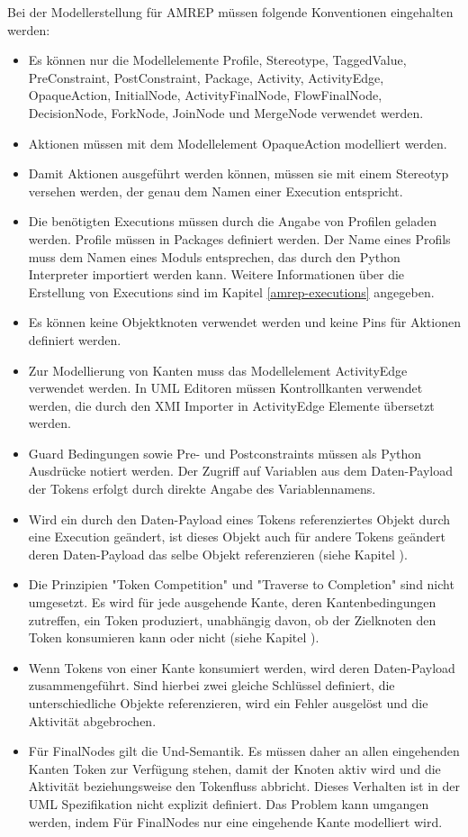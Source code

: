 Bei der Modellerstellung für AMREP müssen folgende Konventionen eingehalten werden:
\begin{itemize}
\item Es können nur die Modellelemente Profile, Stereotype, TaggedValue, PreConstraint, PostConstraint, Package, Activity, ActivityEdge, OpaqueAction, InitialNode, ActivityFinalNode, FlowFinalNode, DecisionNode, ForkNode, JoinNode und MergeNode verwendet werden.
\item Aktionen müssen mit dem Modellelement OpaqueAction  modelliert werden.
\item Damit Aktionen ausgeführt werden können, müssen sie mit einem Stereotyp versehen werden, der genau dem Namen einer Execution entspricht.
\item Die benötigten Executions müssen durch die Angabe von Profilen geladen werden. Profile müssen in Packages definiert werden. Der Name eines Profils muss dem Namen eines Moduls entsprechen, das durch den Python Interpreter importiert werden kann. Weitere Informationen über die Erstellung von Executions sind im Kapitel \ref{amrep-executions} angegeben.
\item Es können keine Objektknoten verwendet werden und keine Pins für Aktionen definiert werden.
\item Zur Modellierung von Kanten muss das Modellelement ActivityEdge verwendet werden. In UML Editoren müssen Kontrollkanten verwendet werden, die durch den XMI Importer in ActivityEdge Elemente übersetzt werden.
\item Guard Bedingungen sowie Pre- und Postconstraints müssen als Python Ausdrücke notiert werden. Der Zugriff auf Variablen aus dem Daten-Payload der Tokens erfolgt durch direkte Angabe des Variablennamens.
\item Wird ein durch den Daten-Payload eines Tokens referenziertes Objekt durch eine Execution geändert, ist dieses Objekt auch für andere Tokens geändert deren Daten-Payload das selbe Objekt referenzieren (siehe Kapitel ).
\item Die Prinzipien "Token Competition" und "Traverse to Completion" sind nicht umgesetzt. Es wird für jede ausgehende Kante, deren Kantenbedingungen zutreffen, ein Token produziert, unabhängig davon, ob der Zielknoten den Token konsumieren kann oder nicht (siehe Kapitel ).
\item Wenn Tokens von einer Kante konsumiert werden, wird deren Daten-Payload zusammengeführt. Sind hierbei zwei gleiche Schlüssel definiert, die unterschiedliche Objekte referenzieren, wird ein Fehler ausgelöst und die Aktivität abgebrochen.
\item Für FinalNodes gilt die Und-Semantik. Es müssen daher an allen eingehenden Kanten Token zur Verfügung stehen, damit der Knoten aktiv wird und die Aktivität beziehungsweise den Tokenfluss abbricht. Dieses Verhalten ist in der UML Spezifikation nicht explizit definiert. Das Problem kann umgangen werden, indem Für FinalNodes nur eine eingehende Kante modelliert wird.
\end{itemize}




